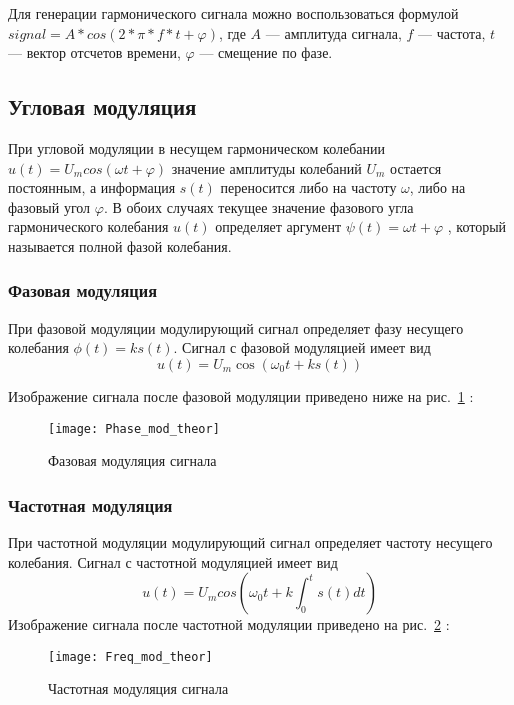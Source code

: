 Для генерации гармонического сигнала можно воспользоваться формулой\\ $signal = A*cos(2*\pi * f*t + \varphi)$,
 где $ A $ --- амплитуда сигнала, $f$ --- частота, $t$ --- вектор отсчетов времени, $\varphi$ --- смещение по фазе.

\subsection{Угловая модуляция}

При угловой модуляции в несущем гармоническом колебании $u(t) = U_m cos(\omega t + \varphi)$ 
 значение амплитуды колебаний $U_m$ остается постоянным, а информация $s(t)$ переносится либо на частоту $\omega$, 
 либо на фазовый угол $\varphi$. В обоих случаях текущее значение фазового угла гармонического 
 колебания $u(t)$ определяет аргумент $\psi (t) = \omega t + \varphi$ ,
  который называется полной фазой колебания.

\subsubsection{Фазовая модуляция}
При фазовой модуляции модулирующий сигнал определяет фазу несущего колебания
$\phi(t) = k s(t)$. Сигнал с фазовой модуляцией имеет вид 
\begin{equation}
    u(t) = U_m \cos(\omega_0 t + k s(t))
\end{equation}


Изображение сигнала после фазовой модуляции приведено ниже на рис.~\ref{pic:Phase_mod_theor} :
\begin{figure}[H]
	\begin{center}
		\texttt{[image: Phase\_mod\_theor]}
		\caption{Фазовая модуляция сигнала} 
		\label{pic:Phase_mod_theor} %
	\end{center}
\end{figure}


\subsubsection{Частотная модуляция}

При частотной модуляции модулирующий сигнал определяет частоту несущего колебания.
Сигнал с частотной модуляцией имеет вид  
\begin{equation}
	u(t) = U_m cos(\omega_0 t + k \int_{0}^{t} s(t) dt)
\end{equation}
Изображение сигнала после частотной модуляции приведено на рис.~\ref{pic:Freq_mod_theor} :
\begin{figure}[H]
	\begin{center}
		\texttt{[image: Freq\_mod\_theor]}
		\caption{Частотная модуляция сигнала} 
		\label{pic:Freq_mod_theor} %
	\end{center}
\end{figure}



